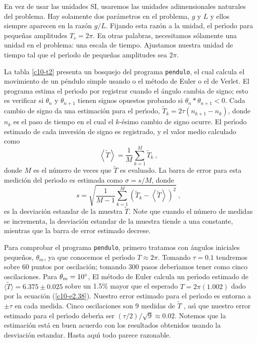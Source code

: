 En vez de usar las unidades SI, usaremos las unidades adimensionales
naturales del problema. Hay solamente dos par{\'a}metros en el problema,
$g$ y $L$ y ellos siempre aparecen en la raz{\'o}n $g/L$. Fijando esta
raz{\'o}n a la unidad, el per{\'\i}odo para peque{\~n}as amplitudes $T_s=2\pi$. En
otras palabras, necesitamos s{\'o}lamente una unidad en el problema: una
escala de tiempo. Ajustamos nuestra unidad de tiempo tal que el
per{\'\i}odo de peque{\~n}as amplitudes sea $2\pi$.

La tabla \ref{c10-t2} presenta un bosquejo del programa \verb|pendulo|,
el cual calcula el movimiento de un p{\'e}ndulo simple usando o el m{\'e}todo
de Euler o el de Verlet. El programa estima el per{\'\i}odo por registrar
cuando el {\'a}ngulo cambia de signo; esto es verificar si $\theta_n$ y
$\theta_{n+1}$ tienen signos opuestos probando si $\theta_n*\theta_{n+1}<0$. Cada
cambio de signo da una estimaci{\'o}n para el per{\'\i}odo,
$\tilde{T}_k=2\tau(n_{k+1}-n_k)$, donde $n_k$ es el paso de tiempo en el
cual el $k$-{\'e}simo cambio de signo ocurre. El per{\'\i}odo estimado de cada
inversi{\'o}n de signo es registrado, y el valor medio calculado como
\begin{equation}
\label{c10-e2.65}
\left \langle \tilde{T}\right \rangle =\frac 1M\sum_{k=1}^M \tilde{T}_k\ ,
\end{equation}
donde $M$ es el n{\'u}mero de veces que $\tilde{T}$ es evaluado. La barra
de error para esta medici{\'o}n del per{\'\i}odo es estimada como $\sigma=s/M$,
donde
\begin{equation}
\label{c10-e2.66}
s=\sqrt{\frac{1}{M-1}\sum_{k=1}^M 
\left (\tilde{T}_k-\left \langle \tilde{T}\right \rangle\right )^2}\ ,
\end{equation}
es la desviaci{\'o}n estandar de la muestra $\tilde{T}$. Note que cuando
el n{\'u}mero de medidas se incrementa, la desviaci{\'o}n estandar de la
muestra tiende a una constante, mientras que la barra de error
estimado decrese.

Para comprobar el programa \verb|pendulo|, primero tratamos con {\'a}ngulos
iniciales peque{\~n}os, $\theta_m$, ya que conocemos el per{\'\i}odo $T\approx 2\pi$.
Tomando $\tau=0.1$ tendremos sobre 60 puntos por oscilaci{\'o}n; tomando 300
pasos deber{\'\i}amos tener como cinco oscilaciones. Para $\theta_m=10^\circ$,
El m{\'e}todo de Euler calcula un per{\'\i}odo estimado de $\langle \tilde{T}\rangle=
6.375\pm0.025$ sobre un 1.5\% mayor que el esperado $T=2\pi(1.002)$ dado
por la ecuaci{\'o}n (\ref{c10-e2.38}). Nuestro error estimado para el
per{\'\i}odo es entorno a $\pm\tau$ en cada medida. Cinco oscilaciones son 9
medidas de $\tilde T$ , as{\'\i} que nuestro error estimado para el per{\'\i}odo
deber{\'\i}a ser $(\tau/2)/ \sqrt{9}\approx0.02$. Notemos que la estimaci{\'o}n est{\'a} en
buen acuerdo con los resultados obtenidos usando la desviaci{\'o}n
estandar.  Hasta aqu{\'\i} todo parece razonable.

